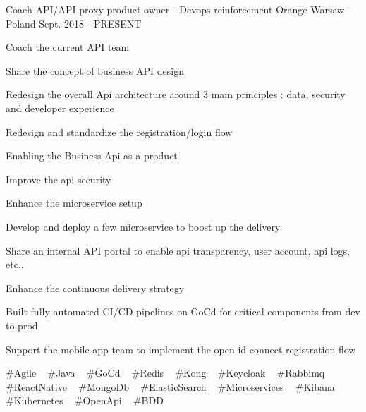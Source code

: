 

\begin{cventries}

  \cventry
    {Coach API/API proxy product owner - Devops reinforcement} %
    {Orange} %
    {Warsaw - Poland} %
    {Sept. 2018 - PRESENT} %
    {
      \begin{cvitems} %
        \item {Coach the current API team}
        \item {Share the concept of business API design}
        \item {Redesign the overall Api architecture around 3 main principles : data, security and developer experience}
        \item {Redesign and standardize the registration/login flow}
        \item {Enabling the Business Api as a product}
        \item {Improve the api security}
        \item {Enhance the microservice setup}
        \item {Develop and deploy a few microservice to boost up the delivery}
        \item {Share an internal API portal to enable api transparency, user account, api logs, etc..}
        \item {Enhance the continuous delivery strategy}
        \item {Built fully automated CI/CD pipelines on GoCd for critical components from dev to prod}
        \item {Support the mobile app team to implement the open id connect registration flow}
      \end{cvitems}
    }
    {
      \#Agile ~
      \#Java ~
      \#GoCd ~
      \#Redis ~
      \#Kong ~
      \#Keycloak ~
      \#Rabbimq ~
      \#ReactNative ~
      \#MongoDb ~
      \#ElasticSearch ~
      \#Microservices ~
      \#Kibana ~
      \#Kubernetes ~
      \#OpenApi ~
      \#BDD
    }


\end{cventries}
